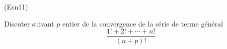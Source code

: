 \begin{tiny}(Esn11)\end{tiny} Discuter suivant $p$ entier de la convergence de la série de terme général 
\begin{displaymath}
  \frac{1! + 2! + \cdots + n!}{(n+p)!}
\end{displaymath}

